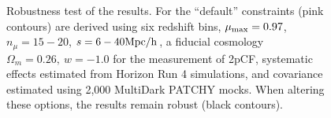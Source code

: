\documentclass[prl,twocolumn,superscriptaddress,aps,amsmath,amssymb,nofootinbib,altaffilletter]{revtex4}
\begin{document}
\begin{figure}
   \caption{\label{fig_contest}
   Robustness test of the results.
   For the ``default'' constraints (pink contours) are derived using six redshift bins, 
   $\mu_{\rm max}=0.97$, $n_{\mu}=15-20$, $s=6-40 \rm Mpc/h$,
   a fiducial cosmology $\Omega_m=0.26,\ w=-1.0$ for the measurement of 2pCF,
   systematic effects estimated from Horizon Run 4 simulations, 
   and covariance estimated using 2,000 MultiDark PATCHY mocks.
   When altering these options, the results remain robust (black contours).
   }
\end{figure}
\end{document}
